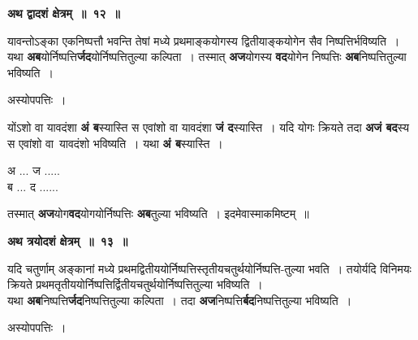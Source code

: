 \documentclass[11pt, openany]{book}
\begin{document}
\newpage
\begin{center}
\textbf{\large अथ द्वादशं क्षेत्रम्~॥~१२~॥}
\end{center}

{\ab यावन्तोऽङ्का एकनिष्पत्तौ भवन्ति तेषां मध्ये प्रथमाङ्कयोगस्य द्वितीयाङ्कयोगेन सैव निष्पत्तिर्भविष्यति~। }\\

 यथा \textbf{अब}योर्निष्पत्ति\textbf{र्जद}योर्निष्पत्तितुल्या कल्पिता~। तस्मात् \textbf{अज}योगस्य \textbf{वद}योगेन निष्पत्तिः \textbf{अब}निष्पत्तितुल्या भविष्यति~। 

 \begin{center}
अस्योपपत्तिः~।
\end{center}
 
\begin{flushleft}
\begin{minipage}[t]{0.67\textwidth}
\hspace{4mm} योंऽशो वा यावदंशा \textbf{अं ब}स्यास्ति स एवांशो वा यावदंशा \textbf{जं द}स्यास्ति~।  यदि योगः क्रियते तदा \textbf{अजं बद}स्य स एवांशो वा \,यावदंशो भविष्यति~।  यथा \textbf{अं ब}स्यास्ति~।
\end{minipage} 
\hfill
\begin{minipage}[t]{0.24\textwidth}
अ ... ज .....\\
ब ... द ......
\end{minipage}
\end{flushleft}
\vspace{-3mm}

\noindent तस्मात् \textbf{अज}योग\textbf{वद}योगयोर्निष्पत्तिः \textbf{अब}तुल्या भविष्यति~। इदमेवास्माकमिष्टम्~॥ 
\vspace{2mm}

\begin{center}
\textbf{\large अथ त्रयोदशं क्षेत्रम्~॥~१३~॥}
\end{center}

{\ab यदि चतुर्णाम् अङ्कानां मध्ये प्रथमद्वितीययोर्निष्पत्तिस्तृतीयचतुर्थयोर्निष्पत्ति-तुल्या भवति~। तयोर्यदि विनिमयः क्रियते प्रथमतृतीययोर्निष्पत्तिर्द्वितीयचतुर्थयोर्निष्पत्तितुल्या भविष्यति~। }\\

 यथा \textbf{अब}निष्पत्ति\textbf{र्जद}निष्पत्तितुल्या कल्पिता~। तदा \textbf{अज}निष्पत्ति\textbf{र्बद}निष्पत्तितुल्या भविष्यति~।

\begin{center}
अस्योपपत्तिः~।
\end{center}
\end{document}

